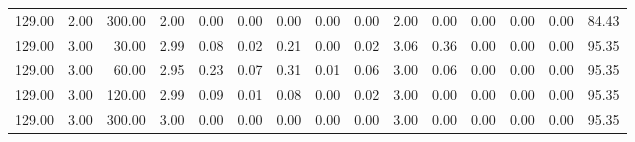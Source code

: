 \begin{table}[ht]
\begin{tabular}{rrrrrrrrrrrrrrr}
  129.00 & 2.00 & 300.00 & 2.00 & 0.00 & 0.00 & 0.00 & 0.00 & 0.00 & 2.00 & 0.00 & 0.00 & 0.00 & 0.00 & 84.43 \\ 
  129.00 & 3.00 & 30.00 & 2.99 & 0.08 & 0.02 & 0.21 & 0.00 & 0.02 & 3.06 & 0.36 & 0.00 & 0.00 & 0.00 & 95.35 \\ 
  129.00 & 3.00 & 60.00 & 2.95 & 0.23 & 0.07 & 0.31 & 0.01 & 0.06 & 3.00 & 0.06 & 0.00 & 0.00 & 0.00 & 95.35 \\ 
  129.00 & 3.00 & 120.00 & 2.99 & 0.09 & 0.01 & 0.08 & 0.00 & 0.02 & 3.00 & 0.00 & 0.00 & 0.00 & 0.00 & 95.35 \\ 
  129.00 & 3.00 & 300.00 & 3.00 & 0.00 & 0.00 & 0.00 & 0.00 & 0.00 & 3.00 & 0.00 & 0.00 & 0.00 & 0.00 & 95.35 \\ 
   \hline
\end{tabular}
\end{table}
